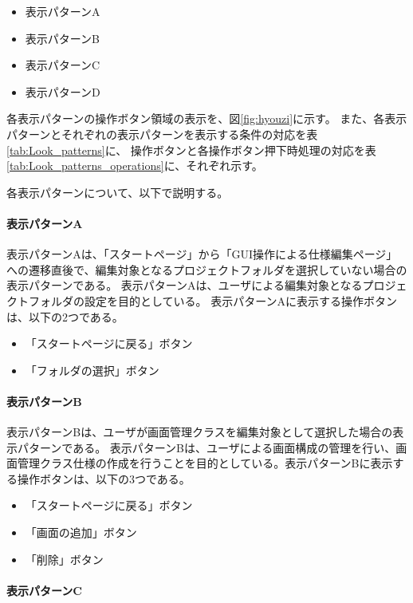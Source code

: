 \begin{itemize}
  \item 表示パターンA
  \item 表示パターンB
  \item 表示パターンC
  \item 表示パターンD
\end{itemize}

各表示パターンの操作ボタン領域の表示を、図\ref{fig:hyouzi}に示す。
また、各表示パターンとそれぞれの表示パターンを表示する条件の対応を表\ref{tab:Look_patterns}に、
操作ボタンと各操作ボタン押下時処理の対応を表\ref{tab:Look_patterns_operations}に、それぞれ示す。

各表示パターンについて、以下で説明する。

\paragraph{表示パターンA}

表示パターンAは、「スタートページ」から「GUI操作による\VDM 仕様編集ページ」への遷移直後で、編集対象となるプロジェクトフォルダを選択していない場合の表示パターンである。
表示パターンAは、ユーザによる編集対象となるプロジェクトフォルダの設定を目的としている。
表示パターンAに表示する操作ボタンは、以下の2つである。

\begin{itemize}
  \item 「スタートページに戻る」ボタン
  \item 「フォルダの選択」ボタン
\end{itemize}

\paragraph{表示パターンB}

表示パターンBは、ユーザが画面管理クラスを編集対象として選択した場合の表示パターンである。
表示パターンBは、ユーザによる画面構成の管理を行い、画面管理クラス仕様の作成を行うことを目的としている。表示パターンBに表示する操作ボタンは、以下の3つである。

\begin{itemize}
  \item 「スタートページに戻る」ボタン
  \item 「画面の追加」ボタン
  \item 「削除」ボタン
\end{itemize}

\paragraph{表示パターンC}

